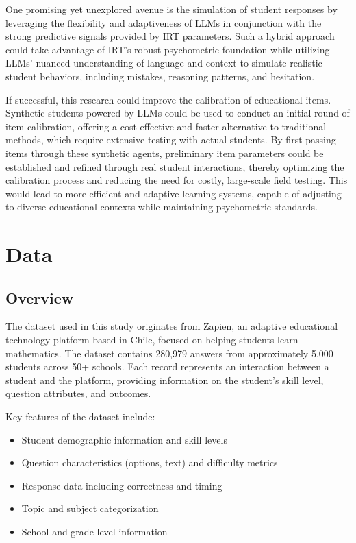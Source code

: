 \documentclass[
    a4paper, %
    10pt, %
    twoside, %
]{LTJournalArticle}
\begin{document}
One promising yet unexplored avenue is the simulation of student responses by leveraging the flexibility and adaptiveness of LLMs in conjunction with the strong predictive signals provided by IRT parameters. Such a hybrid approach could take advantage of IRT's robust psychometric foundation while utilizing LLMs' nuanced understanding of language and context to simulate realistic student behaviors, including mistakes, reasoning patterns, and hesitation.

If successful, this research could improve the calibration of educational items. Synthetic students powered by LLMs could be used to conduct an initial round of item calibration, offering a cost-effective and faster alternative to traditional methods, which require extensive testing with actual students. By first passing items through these synthetic agents, preliminary item parameters could be established and refined through real student interactions, thereby optimizing the calibration process and reducing the need for costly, large-scale field testing. This would lead to more efficient and adaptive learning systems, capable of adjusting to diverse educational contexts while maintaining psychometric standards.

\section{Data}

\subsection{Overview}
The dataset used in this study originates from Zapien, an adaptive educational technology platform based in Chile, focused on helping students learn mathematics. The dataset contains 280,979 answers from approximately 5,000 students across 50+ schools. Each record represents an interaction between a student and the platform, providing information on the student's skill level, question attributes, and outcomes.

Key features of the dataset include:
\begin{itemize}
    \item Student demographic information and skill levels
    \item Question characteristics (options, text) and difficulty metrics
    \item Response data including correctness and timing
    \item Topic and subject categorization
    \item School and grade-level information
\end{itemize}
\end{document}
